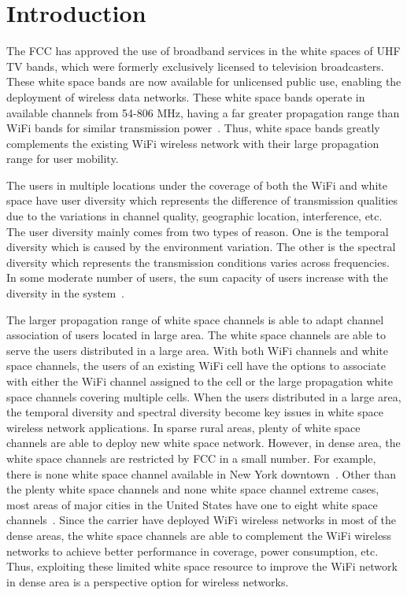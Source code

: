 \section{Introduction}
\label{sec:introduction}

The FCC has approved the use of broadband services in the white spaces of UHF TV bands, 
which were formerly exclusively licensed to television broadcasters. These white space 
bands are now available for unlicensed public use, enabling the deployment of wireless 
data networks. These white space bands operate in available channels from 54-806 MHz, 
having a far greater propagation range than WiFi bands for similar transmission power~\cite{balanis2012antenna}. 
Thus, white space bands greatly complements the existing WiFi wireless network with 
their large propagation range for user mobility. 

The users in multiple locations under the coverage of both the WiFi and white space have user 
diversity which represents the difference of transmission qualities due to 
the variations in channel quality, geographic location, interference, etc.
The user diversity mainly comes from two types of reason. One is the temporal diversity which 
is caused by the environment variation. The other is the spectral diversity which represents 
the transmission conditions varies across frequencies. 
In some moderate number of users, the sum capacity of users increase with the diversity in 
the system~\cite{gan2014multiple}. 

The larger propagation range of white space channels is able to adapt channel association of 
users located in large area. 
The white space channels are able to serve the users distributed in a large area.
With both WiFi channels and white space channels, the users of an existing WiFi cell 
have the options to associate with either the WiFi channel assigned to the cell or the 
large propagation white space channels covering multiple cells.
When the users distributed in a large area, the temporal diversity and spectral diversity become 
key issues in white space wireless network applications. 
In sparse rural areas, plenty of white space channels are able to deploy new white space network. 
However, in dense area, the white space channels are restricted by FCC in a small number.
For example, there is none white space channel available in New York downtown~\cite{googlespectrum}. 
Other than the plenty white space channels and none white space channel extreme cases, most areas 
of major cities in the United States have one to eight 
white space channels~\cite{googlespectrum}. 
Since the carrier have deployed WiFi wireless networks in most of the dense areas,
the white space channels are able to complement the WiFi wireless networks to achieve better 
performance in coverage, power consumption, etc. Thus, exploiting these limited white space resource 
to improve the WiFi network in dense area is a perspective option for wireless networks. 

